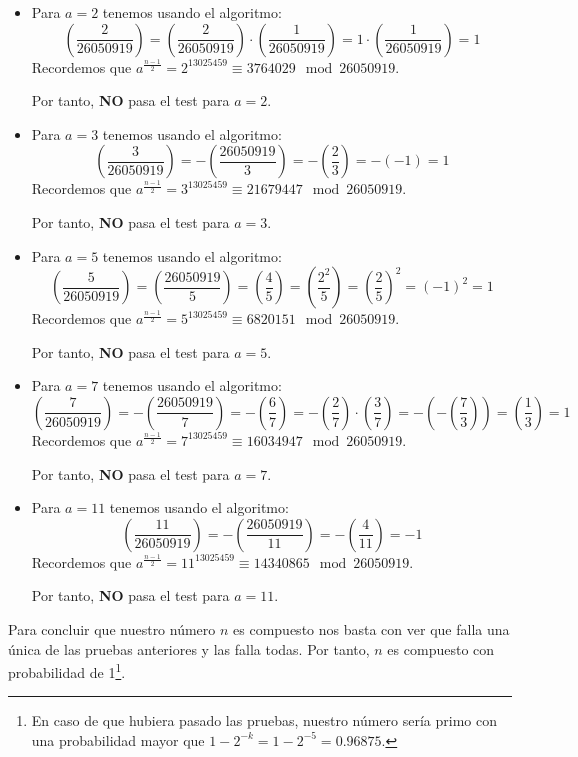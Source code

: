 \begin{enumerate}
		\begin{itemize}
			\item Para $a = 2$ tenemos usando el algoritmo:
			$$\left(\frac{2}{26050919} \right) = \left(\frac{2}{26050919} \right) \cdot \left(\frac{1}{26050919}
			\right) = 1 \cdot \left(\frac{1}{26050919} \right) = 1$$
			Recordemos que $ a^{\frac{n-1}{2}} = 2^{13025459} \equiv 3764029 \mod 26050919$.
			
			Por tanto, \textbf{NO} pasa el test para $a = 2$.
			
			\item Para $a = 3$ tenemos usando el algoritmo:
			$$\left(\frac{3}{26050919} \right) = -\left(\frac{26050919}{3} \right) = -\left(\frac{2}{3}\right) =
			-(-1) = 1$$
			Recordemos que $ a^{\frac{n-1}{2}} = 3^{13025459} \equiv 21679447 \mod 26050919$.
			
			Por tanto, \textbf{NO} pasa el test para $a = 3$.
			
			\item Para $a = 5$ tenemos usando el algoritmo:
			$$\left(\frac{5}{26050919} \right) = \left(\frac{26050919}{5} \right) =  \left(\frac{4}{5} \right) =
			\left(\frac{2^2}{5} \right) = \left(\frac{2}{5} \right)^2 = (-1)^2 = 1$$
			Recordemos que $ a^{\frac{n-1}{2}} = 5^{13025459} \equiv 6820151 \mod 26050919$.
			
			Por tanto, \textbf{NO} pasa el test para $a = 5$.
			
			\item Para $a = 7$ tenemos usando el algoritmo:
			$$\left(\frac{7}{26050919} \right) = -\left(\frac{26050919}{7} \right) = -\left(\frac{6}{7} \right) =
			-\left(\frac{2}{7} \right) \cdot \left(\frac{3}{7} \right) = -\left(-\left(\frac{7}{3} \right) \right)
			= \left(\frac{1}{3} \right) = 1$$
			Recordemos que $ a^{\frac{n-1}{2}} = 7^{13025459} \equiv 16034947 \mod 26050919$.
			
			Por tanto, \textbf{NO} pasa el test para $a = 7$.
			
			\item Para $a = 11$ tenemos usando el algoritmo:
			$$\left(\frac{11}{26050919} \right) = -\left(\frac{26050919}{11} \right) = -\left(\frac{4}{11} \right) = -1$$
			Recordemos que $ a^{\frac{n-1}{2}} = 11^{13025459} \equiv 14340865 \mod 26050919$.
			
			Por tanto, \textbf{NO} pasa el test para $a = 11$.		
		\end{itemize}
		
		Para concluir que nuestro número $n$ es compuesto nos basta con ver que falla una única de las pruebas
		anteriores y las falla todas. Por tanto, $n$ es compuesto con probabilidad de 1\footnote{En caso de que
		hubiera pasado las pruebas, nuestro número sería primo con una probabilidad mayor que $1-2^{-k} =
		1-2^{-5} = 0.96875$.}.
		
	\end{enumerate}
